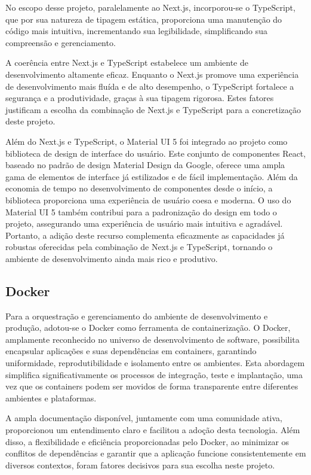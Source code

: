 No escopo desse projeto, paralelamente ao Next.js, incorporou-se o TypeScript, que por sua natureza de tipagem estática, proporciona uma manutenção do código mais intuitiva, incrementando sua legibilidade, simplificando sua compreensão e gerenciamento.

A coerência entre Next.js e TypeScript estabelece um ambiente de desenvolvimento altamente eficaz. Enquanto o Next.js promove uma experiência de desenvolvimento mais fluída e de alto desempenho, o TypeScript fortalece a segurança e a produtividade, graças à sua tipagem rigorosa. Estes fatores justificam a escolha da combinação de Next.js e TypeScript para a concretização deste projeto.

Além do Next.js e TypeScript, o Material UI 5 foi integrado ao projeto como biblioteca de design de interface do usuário. Este conjunto de componentes React, baseado no padrão de design Material Design da Google, oferece uma ampla gama de elementos de interface já estilizados e de fácil implementação. Além da economia de tempo no desenvolvimento de componentes desde o início, a biblioteca proporciona uma experiência de usuário coesa e moderna. O uso do Material UI 5 também contribui para a padronização do design em todo o projeto, assegurando uma experiência de usuário mais intuitiva e agradável. Portanto, a adição deste recurso complementa eficazmente as capacidades já robustas oferecidas pela combinação de Next.js e TypeScript, tornando o ambiente de desenvolvimento ainda mais rico e produtivo.

\subsection{Docker}
Para a orquestração e gerenciamento do ambiente de desenvolvimento e produção, adotou-se o Docker como ferramenta de containerização. O Docker, amplamente reconhecido no universo de desenvolvimento de software, possibilita encapsular aplicações e suas dependências em containers, garantindo uniformidade, reprodutibilidade e isolamento entre os ambientes. Esta abordagem simplifica significativamente os processos de integração, teste e implantação, uma vez que os containers podem ser movidos de forma transparente entre diferentes ambientes e plataformas.

A ampla documentação disponível, juntamente com uma comunidade ativa, proporcionou um entendimento claro e facilitou a adoção desta tecnologia. Além disso, a flexibilidade e eficiência proporcionadas pelo Docker, ao minimizar os conflitos de dependências e garantir que a aplicação funcione consistentemente em diversos contextos, foram fatores decisivos para sua escolha neste projeto.

